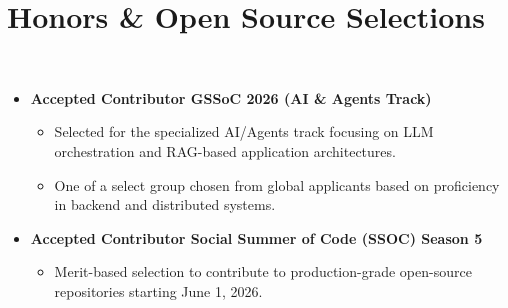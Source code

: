 \section*{Honors \& Open Source Selections}
\BigDivider\\
\begin{itemize}[leftmargin=*, itemsep=0.4em]
    \item \textbf{Accepted Contributor \textbar{} GSSoC 2026 (AI \& Agents Track)}
    \begin{itemize}[leftmargin=1.5em, itemsep=0.2em, topsep=0.1em]
        \item Selected for the specialized AI/Agents track focusing on LLM orchestration and RAG-based application architectures.
        \item One of a select group chosen from global applicants based on proficiency in backend and distributed systems.
    \end{itemize}

    \item \textbf{Accepted Contributor \textbar{} Social Summer of Code (SSOC) Season 5}
    \begin{itemize}[leftmargin=1.5em, itemsep=0.2em, topsep=0.1em]
        \item Merit-based selection to contribute to production-grade open-source repositories starting June 1, 2026.
    \end{itemize}
\end{itemize}
